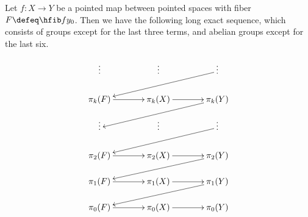 \begin{thm}\label{thm:les}
  Let $f:X \to Y$ be a pointed map between pointed spaces with fiber $F\defeq \hfib f {y_0}$.
  Then we have the following long exact sequence, which consists of groups except for the last three terms, and abelian groups except for the last six.

  \[
  \xymatrix@R=1.2pc@C=3pc{
    \vdots & \vdots & \vdots \ar[lld] \\
    \pi_k(F) \ar[r] & \pi_k(X) \ar[r] & \pi_k(Y) \ar[lld] \\
    \vdots & \vdots & \vdots \ar[lld] \\
    \pi_2(F) \ar[r] & \pi_2(X) \ar[r] & \pi_2(Y) \ar[lld] \\
    \pi_1(F) \ar[r] & \pi_1(X) \ar[r] & \pi_1(Y) \ar[lld]\\
    \pi_0(F) \ar[r] & \pi_0(X) \ar[r] & \pi_0(Y)}
  \]
\end{thm}

\vspace*{0pt plus 10ex}
\goodbreak

